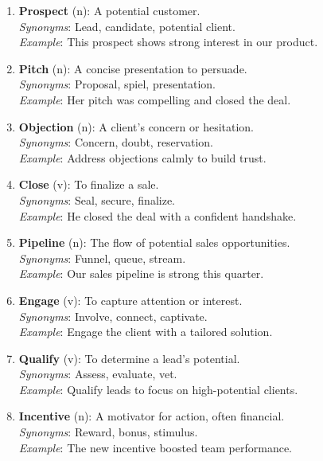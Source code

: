 \documentclass[11pt, a4paper]{article}
\begin{document}
\begin{enumerate}[label=\arabic*.]
    \item \textbf{Prospect} (n): A potential customer. \\
          \textit{Synonyms}: Lead, candidate, potential client. \\
          \textit{Example}: This prospect shows strong interest in our product.
    \item \textbf{Pitch} (n): A concise presentation to persuade. \\
          \textit{Synonyms}: Proposal, spiel, presentation. \\
          \textit{Example}: Her pitch was compelling and closed the deal.
    \item \textbf{Objection} (n): A client’s concern or hesitation. \\
          \textit{Synonyms}: Concern, doubt, reservation. \\
          \textit{Example}: Address objections calmly to build trust.
    \item \textbf{Close} (v): To finalize a sale. \\
          \textit{Synonyms}: Seal, secure, finalize. \\
          \textit{Example}: He closed the deal with a confident handshake.
    \item \textbf{Pipeline} (n): The flow of potential sales opportunities. \\
          \textit{Synonyms}: Funnel, queue, stream. \\
          \textit{Example}: Our sales pipeline is strong this quarter.
    \item \textbf{Engage} (v): To capture attention or interest. \\
          \textit{Synonyms}: Involve, connect, captivate. \\
          \textit{Example}: Engage the client with a tailored solution.
    \item \textbf{Qualify} (v): To determine a lead’s potential. \\
          \textit{Synonyms}: Assess, evaluate, vet. \\
          \textit{Example}: Qualify leads to focus on high-potential clients.
    \item \textbf{Incentive} (n): A motivator for action, often financial. \\
          \textit{Synonyms}: Reward, bonus, stimulus. \\
          \textit{Example}: The new incentive boosted team performance.

\end{enumerate}
\end{document}
